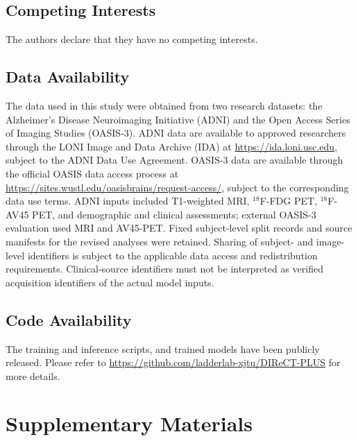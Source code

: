 \documentclass{article}
\begin{document}
\subsection*{Competing Interests}
The authors declare that they have no competing interests.

\subsection*{Data Availability}
The data used in this study were obtained from two research datasets: the Alzheimer's Disease Neuroimaging Initiative (ADNI) and the Open Access Series of Imaging Studies (OASIS-3). ADNI data are available to approved researchers through the LONI Image and Data Archive (IDA) at \url{https://ida.loni.usc.edu}, subject to the ADNI Data Use Agreement. OASIS-3 data are available through the official OASIS data access process at \url{https://sites.wustl.edu/oasisbrains/request-access/}, subject to the corresponding data use terms. ADNI inputs included T1-weighted MRI, $^{18}$F-FDG PET, $^{18}$F-AV45 PET, and demographic and clinical assessments; external OASIS-3 evaluation used MRI and AV45-PET. Fixed subject-level split records and source manifests for the revised analyses were retained. Sharing of subject- and image-level identifiers is subject to the applicable data access and redistribution requirements. Clinical-source identifiers must not be interpreted as verified acquisition identifiers of the actual model inputs.

\subsection*{Code Availability}
The training and inference scripts, and trained models have been publicly released. Please refer to \url{https://github.com/ladderlab-xjtu/DIReCT-PLUS} for more details.

\section*{Supplementary Materials}
\begingroup
\setcounter{figure}{0}
\renewcommand{\thefigure}{S\arabic{figure}}
\renewcommand{\theHfigure}{S\arabic{figure}}
\setcounter{table}{0}
\renewcommand{\thetable}{S\arabic{table}}
\renewcommand{\theHtable}{S\arabic{table}}

\clearpage
\endgroup

\printbibliography
\end{document}
